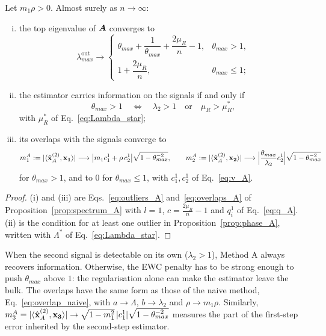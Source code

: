 \begin{prop}[Method A]\label{prop:methodA}
Let $m_1\rho > 0$. Almost surely as $n\to\infty$:
\begin{enumerate}[(i)]
    \item the top eigenvalue of $\bm{A}$ converges to
    \begin{equation}
        \lambda^{\mathrm{out}}_{max} \longrightarrow
        \begin{cases}
            \theta_{max} + \dfrac{1}{\theta_{max}} + \dfrac{2\mu_R}{n} - 1, & \theta_{max} > 1,\\[6pt]
            1 + \dfrac{2\mu_R}{n}, & \theta_{max} \le 1 ;
        \end{cases}
        \label{eq:top_eigenvalue_A}
    \end{equation}
    \item the estimator carries information on the signals if and only if
    \begin{equation}
        \theta_{max} > 1
        \quad\Longleftrightarrow\quad
        \lambda_2 > 1
        \quad\text{or}\quad
        \mu_R > \mu_R^* ,
        \label{eq:condition_A}
    \end{equation}
    with $\mu_R^*$ of Eq.~\eqref{eq:Lambda_star};
    \item its overlaps with the signals converge to
    \begin{equation}
        m^A_1 := |\langle \hat{\boldsymbol{\mathbf{x}}}^{(2)}_A, \boldsymbol{\mathbf{x_1}}\rangle| \longrightarrow \big\lvert m_1 c_1^1 + \rho\, c_2^1 \big\rvert \sqrt{1-\theta_{max}^{-2}} ,
        \qquad
        m^A_2 := |\langle \hat{\boldsymbol{\mathbf{x}}}^{(2)}_A, \boldsymbol{\mathbf{x_2}}\rangle| \longrightarrow \Big \lvert  \frac{\theta_{max}}{\lambda_2}c_2^1  \Big \rvert \sqrt{1-\theta_{max}^{-2}}
        \label{eq:overlap_A}
    \end{equation}
    for $\theta_{max} > 1$, and to $0$ for $\theta_{max} \le 1$, with $c_1^1, c_2^1$ of Eq.~\eqref{eq:v_A}.
\end{enumerate}
\end{prop}
\begin{proof}
(i) and (iii) are Eqs.~\eqref{eq:outliers_A} and~\eqref{eq:overlaps_A} of Proposition~\ref{prop:spectrum_A} with $l=1$, $c = \frac{2\mu_R}{n}-1$ and $q_i^1$ of Eq.~\eqref{eq:q_A}. (ii) is the condition for at least one outlier in Proposition~\ref{prop:phase_A}, written with $\Lambda^*$ of Eq.~\eqref{eq:Lambda_star}.
\end{proof}
\noindent
When the second signal is detectable on its own ($\lambda_2>1$), Method A always recovers information. Otherwise, the EWC penalty has to be strong enough to push $\theta_{max}$ above $1$: the regularisation alone can make the estimator leave the bulk. The overlaps have the same form as those of the naive method, Eq.~\eqref{eq:overlap_naive}, with $a \to \Lambda$, $b \to \lambda_2$ and $\rho \to m_1\rho$. Similarly, $m^A_3 = |\langle \hat{\boldsymbol{\mathbf{x}}}^{(2)}_A, \boldsymbol{\mathbf{x_3}}\rangle| \to \sqrt{1-m_1^2}\,|c_1^1|\sqrt{1-\theta_{max}^{-2}}$ measures the part of the first-step error inherited by the second-step estimator.

